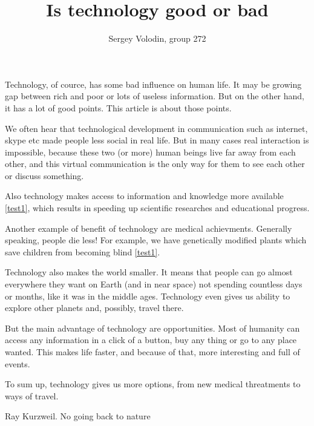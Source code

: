 \documentclass[a4paper]{article}
\author{Sergey Volodin, group 272}
\title{Is technology good or bad}
\begin{document}
\maketitle
Technology, of cource, has some bad influence on human life. It may be growing gap between rich and poor or lots of useless information. But on the other hand, it has a lot of good points. This article is about those points.

We often hear that technological development in communication such as internet, skype etc made people less social in real life. But in many cases real interaction is impossible, because these two (or more) human beings live far away from each other, and this virtual communication is the only way for them to see each other or discuss something.

Also technology makes access to information and knowledge more available \ref{test1}, which results in speeding up scientific researches and educational progress.

Another example of benefit of technology are medical achievments. Generally speaking, people die less! For example, we have genetically modified plants which save children from becoming blind \ref{test1}.

Technology also makes the world smaller. It means that people can go almost everywhere they want on Earth (and in near space) not spending countless days or months, like it was in the middle ages. Technology even gives us ability to explore other planets and, possibly, travel there.

But the main advantage of technology are opportunities. Most of humanity can access any information in a click of a button, buy any thing or go to any place wanted. This makes life faster, and because of that, more interesting and full of events.

To sum up, technology gives us more options, from new medical threatments to ways of travel.
\begin{thebibliography}{widestlabel}
 Ray Kurzweil. No going back to nature
\end{thebibliography}
\end{document}
